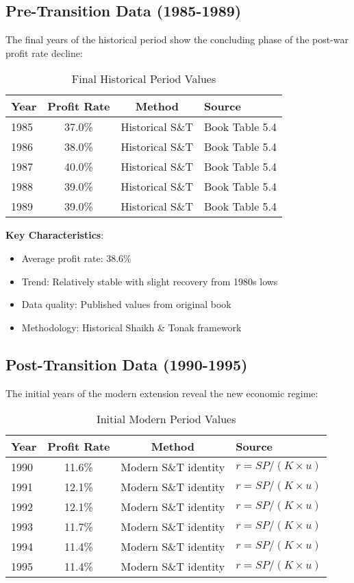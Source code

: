 \documentclass[12pt]{article}
\begin{document}
\subsection{Pre-Transition Data (1985-1989)}

The final years of the historical period show the concluding phase of the post-war profit rate decline:

\begin{table}[h]
\centering
\begin{tabular}{lccl}
\toprule
\textbf{Year} & \textbf{Profit Rate} & \textbf{Method} & \textbf{Source} \\
\midrule
1985 & 37.0\% & Historical S\&T & Book Table 5.4 \\
1986 & 38.0\% & Historical S\&T & Book Table 5.4 \\
1987 & 40.0\% & Historical S\&T & Book Table 5.4 \\
1988 & 39.0\% & Historical S\&T & Book Table 5.4 \\
1989 & 39.0\% & Historical S\&T & Book Table 5.4 \\
\bottomrule
\end{tabular}
\caption{Final Historical Period Values}
\label{tab:pre_transition}
\end{table}

\textbf{Key Characteristics}:
\begin{itemize}
    \item Average profit rate: 38.6\%
    \item Trend: Relatively stable with slight recovery from 1980s lows
    \item Data quality: Published values from original book
    \item Methodology: Historical Shaikh \& Tonak framework
\end{itemize}

\subsection{Post-Transition Data (1990-1995)}

The initial years of the modern extension reveal the new economic regime:

\begin{table}[h]
\centering
\begin{tabular}{lccl}
\toprule
\textbf{Year} & \textbf{Profit Rate} & \textbf{Method} & \textbf{Source} \\
\midrule
1990 & 11.6\% & Modern S\&T identity & $r = SP/(K \times u)$ \\
1991 & 12.1\% & Modern S\&T identity & $r = SP/(K \times u)$ \\
1992 & 12.1\% & Modern S\&T identity & $r = SP/(K \times u)$ \\
1993 & 11.7\% & Modern S\&T identity & $r = SP/(K \times u)$ \\
1994 & 11.4\% & Modern S\&T identity & $r = SP/(K \times u)$ \\
1995 & 11.4\% & Modern S\&T identity & $r = SP/(K \times u)$ \\
\bottomrule
\end{tabular}
\caption{Initial Modern Period Values}
\label{tab:post_transition}
\end{table}
\end{document}
